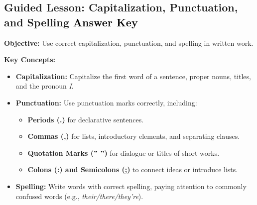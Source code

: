 \documentclass[12pt]{article}
\title{}
\date{}
\begin{document}
\subsection*{Guided Lesson: Capitalization, Punctuation, and Spelling \textcolor{black}{Answer Key}}
\onehalfspacing

\begin{tcolorbox}[colframe=black!40, colback=gray!5, 
coltitle=black, colbacktitle=black!20, fonttitle=\bfseries\Large, 
title=Learning Objective, halign title=center, left=5pt, right=5pt, top=5pt, bottom=15pt]
\textbf{Objective:} Use correct capitalization, punctuation, and spelling in written work.
\end{tcolorbox}

\vspace{1em}

\begin{tcolorbox}[colframe=black!60, colback=white, 
coltitle=black, colbacktitle=black!15, fonttitle=\bfseries\Large, 
title=Key Concepts and Vocabulary, halign title=center, left=10pt, right=10pt, top=10pt, bottom=15pt]
\textbf{Key Concepts:}
\begin{itemize}
    \item \textbf{Capitalization:} Capitalize the first word of a sentence, proper nouns, titles, and the pronoun \textit{I}.
    \item \textbf{Punctuation:} Use punctuation marks correctly, including:
    \begin{itemize}
        \item \textbf{Periods (.)} for declarative sentences.
        \item \textbf{Commas (,)} for lists, introductory elements, and separating clauses.
        \item \textbf{Quotation Marks (” ”)} for dialogue or titles of short works.
        \item \textbf{Colons (:) and Semicolons (;)} to connect ideas or introduce lists.
    \end{itemize}
    \item \textbf{Spelling:} Write words with correct spelling, paying attention to commonly confused words (e.g., \textit{their/there/they're}).
\end{itemize}
\end{tcolorbox}

\vspace{1em}
\end{document}
